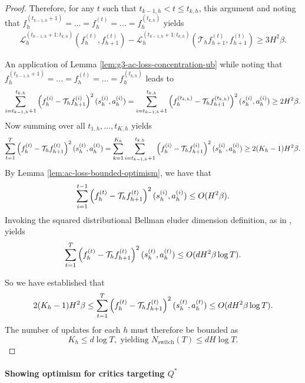 \begin{proof}
    Therefore, for any $t$ such that $t_{k-1,h} < t \leq t_{k,h}$, this argument and noting that $f_h^{(t_{k-1,h}+1)} = ... = f_h^{(t)} = ... = f_h^{(t_{k,h})}$ yields
    \begin{align}\mathcal{L}_h^{(t_{k-1,h}+1:t_{k,h})}\left(f_h^{(t)}, f_{h+1}^{(t)}\right)-\mathcal{L}_h^{\left(t_{k-1,h}+1:t_{k,h}\right)}\left(\mathcal{T}_h f_{h+1}^{(t)}, f_{h+1}^{(t)}\right) \geq 3H^2\beta.
    \end{align}

    An application of Lemma \ref{lem:g3-ac-loss-concentration-ub} while noting that $f_h^{(t_{k-1,h}+1)} = ... = f_h^{(t)} = ... = f_h^{(t_{k,h})}$ leads to 
    \begin{align}\sum_{i=t_{k-1,h}+1}^{t_{k,h}}\left(f_h^{(i)} - {\mathcal{T}}_h f_{h+1}^{(i)}\right)^2(s_h^{(i)}, a_h^{(i)}) = \sum_{i=t_{k-1,h}+1}^{t_{k,h}}\left(f_h^{(t_{k,h})} - {\mathcal{T}}_h f_{h+1}^{(t_{k,h})}\right)^2(s_h^{(i)}, a_h^{(i)}) \geq 2H^2\beta.\end{align}
    Now summing over all $t_{1,h},...,t_{K,h}$ yields 
    \begin{align}\sum_{t=1}^T \left(f_h^{(t)} - {\mathcal{T}}_h f_{h+1}^{(t)}\right)^2(s_h^{(t)}, a_h^{(t)}) = \sum_{k=1}^{K_h} \sum_{i=t_{k-1,h}+1}^{t_{k,h}} \left(f_h^{(i)} - {\mathcal{T}}_h f_{h+1}^{(i)}\right)^2(s_h^{(i)}, a_h^{(i)}) \geq 2(K_h-1)H^2\beta.\end{align}
    By Lemma \ref{lem:ac-loss-bounded-optimism}, we have that 
    \begin{align}\sum_{i=1}^{t-1} \left(f_h^{(t)} - {\mathcal{T}}_h f_{h+1}^{(t)}\right)^2(s_h^{(i)}, a_h^{(i)}) \leq O(H^2\beta).\end{align}
    Invoking the squared distributional Bellman eluder dimension definition, as in \cite{xiong2023generalframeworksequentialdecisionmaking}, yields 
    \begin{align}\sum_{t=1}^{T} \left(f_h^{(t)} - {\mathcal{T}}_h f_{h+1}^{(t)}\right)^2(s_h^{(t)}, a_h^{(t)}) \leq O(dH^2\beta\log T).\end{align}

    So we have established that 
    \begin{align}2(K_h-1)H^2\beta \leq \sum_{t=1}^{T} \left(f_h^{(t)} - {\mathcal{T}}_h f_{h+1}^{(t)}\right)^2(s_h^{(t)}, a_h^{(t)}) \leq O(dH^2\beta\log T).\end{align}
    The number of updates for each $h$ must therefore be bounded as
    $$K_h \leq d \log T, \text{ yielding } N_{\text{switch}}(T) \leq dH\log T.$$
\end{proof}

\paragraph{Showing optimism for critics targeting $Q^{*}$}

